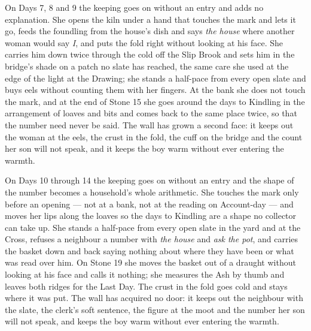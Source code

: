 \documentclass{design/chronicle}
\begin{document}
{On Days 7, 8 and 9 the keeping goes on without an entry and adds no explanation. She opens the kiln under a hand that touches the mark and lets it go, feeds the foundling from the house’s dish and says \emph{the house} where another woman would say \emph{I}, and puts the fold right without looking at his face. She carries him down twice through the cold off the Slip Brook and sets him in the bridge’s shade on a patch no slate has reached, the same care she used at the edge of the light at the Drawing; she stands a half-pace from every open slate and buys eels without counting them with her fingers. At the bank she does not touch the mark, and at the end of Stone 15 she goes around the days to Kindling in the arrangement of loaves and bits and comes back to the same place twice, so that the number need never be said. The wall has grown a second face: it keeps out the woman at the eels, the crust in the fold, the cuff on the bridge and the count her son will not speak, and it keeps the boy warm without ever entering the warmth.

On Days 10 through 14 the keeping goes on without an entry and the shape of the number becomes a household’s whole arithmetic. She touches the mark only before an opening --- not at a bank, not at the reading on Account-day --- and moves her lips along the loaves so the days to Kindling are a shape no collector can take up. She stands a half-pace from every open slate in the yard and at the Cross, refuses a neighbour a number with \emph{the house} and \emph{ask the pot}, and carries the basket down and back saying nothing about where they have been or what was read over him. On Stone 19 she moves the basket out of a draught without looking at his face and calls it nothing; she measures the Ash by thumb and leaves both ridges for the Last Day. The crust in the fold goes cold and stays where it was put. The wall has acquired no door: it keeps out the neighbour with the slate, the clerk’s soft sentence, the figure at the moot and the number her son will not speak, and keeps the boy warm without ever entering the warmth.

}
\end{document}
